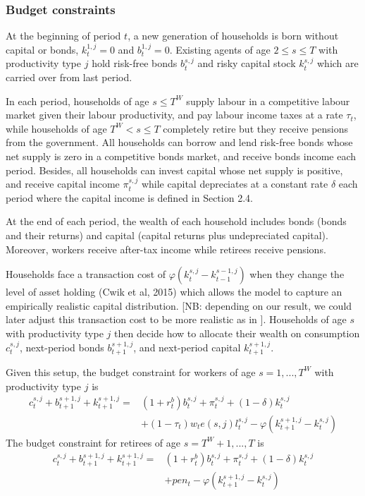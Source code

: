 \documentclass[12pt]{article}
\begin{document}
\subsubsection{Budget constraints}
At the beginning of period $t$, a new generation of households is born without capital or bonds, $k_t^{1,j}=0$ and $b_t^{1,j}=0$. Existing agents of age $2\leq s\leq T$ with productivity type $j$ hold risk-free bonds $b_{t}^{s,j}$ and risky capital stock $k_{t}^{s,j}$ which are carried over from last period. 

In each period, households of age $s\leq T^W$ supply labour in a competitive labour market given their labour productivity, and pay labour income taxes at a rate $\tau_t$, while households of age $T^W<s\leq T$ completely retire but they receive pensions from the government. All households can borrow and lend risk-free bonds whose net supply is zero in a competitive bonds market, and receive bonds income each period. Besides, all households can invest capital whose net supply is positive, and receive capital income $\pi_t^{s,j}$ while capital depreciates at a constant rate $\delta$ each period where the capital income is defined in Section 2.4.

At the end of each period, the wealth of each household includes bonds (bonds and their returns) and capital (capital returns plus undepreciated capital). Moreover, workers receive after-tax income while retirees receive pensions. 

Households face a transaction cost of $\varphi(k_{t}^{s,j}-k_{t-1}^{s-1,j})$ when they change the level of asset holding (Cwik et al, 2015) which allows the model to capture an empirically realistic capital distribution. [NB: depending on our result, we could later adjust this transaction cost to be more realistic as in \cite{fagereng2017asset} ]. Households of age $s$ with productivity type $j$ then decide how to allocate their wealth on consumption $c_{t}^{s,j}$, next-period bonds $b_{t+1}^{s+1,j}$, and next-period capital $k_{t+1}^{s+1,j}$. 

Given this setup, the budget constraint for workers of age $s=1,..., T^W$ with productivity type $j$ is
\begin{equation}
\begin{split} 
c_{t}^{s,j}+ b_{t+1}^{s+1,j} + k_{t+1}^{s+1,j}=&
(1+r_t^b)b_{t}^{s,j}+\pi_t^{s,j}+(1-\delta)k_{t}^{s,j}\\
&+(1-\tau_t)w_te(s,j)l_{t}^{s,j}-\varphi(k_{t+1}^{s+1,j}-k_{t}^{s,j}) \label{eq:15}
\end{split}
\end{equation}
The budget constraint for retirees of age $s=T^W+1,...,T$ is 
\begin{equation}
\begin{split} 
c_{t}^{s,j}+ b_{t+1}^{s+1,j} + k_{t+1}^{s+1,j}=&
(1+r_t^b)b_{t}^{s,j}
+\pi_t^{s,j}+(1-\delta)k_{t}^{s,j}\\
&+pen_t-\varphi(k_{t+1}^{s+1,j}-k_{t}^{s,j}) \label{eq:16}
\end{split}
\end{equation}
\end{document}
